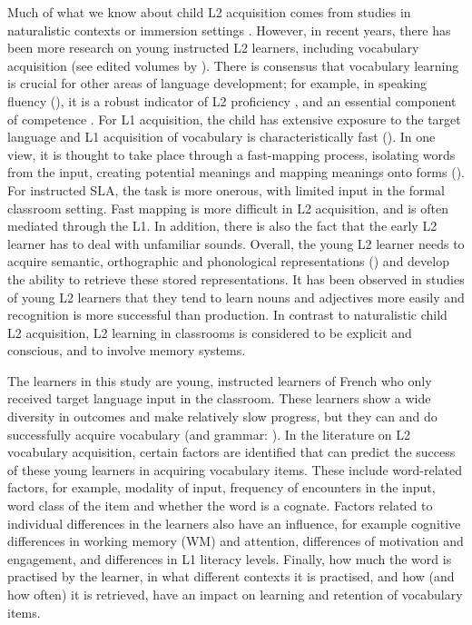 \documentclass[output=paper]{langscibook}
\begin{document}
Much of what we know about child L2 acquisition comes from studies in naturalistic contexts or immersion settings \citep{Murphy2014}. However, in recent years, there has been more research on young instructed L2 learners, including vocabulary acquisition (see edited volumes by \citealt{Nikolov2009,Pinter2011,Garcia2017}). There is consensus that vocabulary learning is crucial for other areas of language development; for example, in speaking fluency (\citealt{DeJongEtAl2013}), it is a robust indicator of L2 proficiency \citep{Cummins2000}, and an essential component of competence \citep{Alexiou2009}. For L1 acquisition, the child has extensive exposure to the target language and L1 acquisition of vocabulary is characteristically fast (\citealt{QianLin2020}). In one view, it is thought to take place through a fast-mapping process, isolating words from the input, creating potential meanings and mapping meanings onto forms (\citealt{RohdeTiefenthal2000}). For instructed SLA, the task is more onerous, with limited input in the formal classroom setting. Fast mapping is more difficult in L2 acquisition, and is often mediated through the L1. In addition, there is also the fact that the early L2 learner has to deal with unfamiliar sounds. Overall, the young L2 learner needs to acquire semantic, orthographic and phonological representations (\citealt{ZhaoMurphy2017}) and develop the ability to retrieve these stored representations. It has been observed in studies of young L2 learners that they tend to learn nouns and adjectives more easily \citep{CableEtAl2010} and recognition is more successful than production. In contrast to naturalistic child L2 acquisition, L2 learning in classrooms is considered to be explicit and conscious, and to involve memory systems.

The learners in this study are young, instructed learners of French who only received target language input in the classroom. These learners show a wide diversity in outcomes and make relatively slow progress, but they can and do successfully acquire vocabulary (and grammar: \citealt{MitchellMyles2019}). In the literature on L2 vocabulary acquisition, certain factors are identified that can predict the success of these young learners in acquiring vocabulary items. These include word-related factors, for example, modality of input, frequency of encounters in the input, word class of the item and whether the word is a cognate. Factors related to individual differences in the learners also have an influence, for example cognitive differences in working memory (WM) and attention, differences of motivation and engagement, and differences in L1 literacy levels. Finally, how much the word is practised by the learner, in what different contexts it is practised, and how (and how often) it is retrieved, have an impact on learning and retention of vocabulary items.
\end{document}
